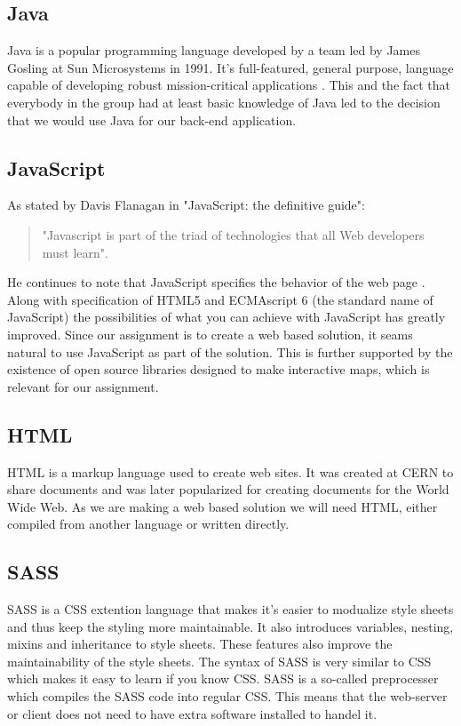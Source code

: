 \documentclass[11pt,a4paper,titlepage,oneside]{report}
\begin{document}
  \subsection{Java}
  Java is a popular programming language developed by a team led by James Gosling at Sun Microsystems in 1991. It's full-featured, general purpose, language capable of developing robust mission-critical applications \cite{liang}. This and the fact that everybody in the group had at least basic knowledge of Java led to the decision that we would use Java for our \gls{back-end} application.  
  \subsection{JavaScript}
  As stated by Davis Flanagan in "JavaScript: the definitive guide": 
  \begin{quote}
  "Javascript is part of the triad of technologies that all Web developers must learn".
  \end{quote} 
  He continues to note that JavaScript specifies the behavior of the web page \cite{fd11}. Along with specification of \gls{HTML5} and ECMAscript 6 (the standard name of JavaScript) the possibilities of what you can achieve with JavaScript has greatly improved. Since our assignment is to create a web based solution, it seams natural to use JavaScript as part of the solution. This is further supported by the existence of \gls{open source} libraries designed to make interactive maps, which is relevant for our assignment.

\subsection{HTML}
  \gls{HTML} is a markup language used to create web sites. It was created at CERN to share documents and was later popularized for creating documents for the World Wide Web. As we are making a web based solution we will need \gls{HTML}, either compiled from another language or written directly.
  \subsection{SASS}
  \gls{SASS} is a \gls{CSS} extention language that makes it's easier to modualize style sheets and thus keep the styling more maintainable. It also introduces variables, nesting, mixins and inheritance to style sheets. These features also improve the maintainability of the style sheets. The syntax of \gls{SASS} is very similar to \gls{CSS} which makes it easy to learn if you know \gls{CSS}. \gls{SASS} is a so-called preprocesser which compiles the \gls{SASS} code into regular \gls{CSS}. This means that the web-server or client does not need to have extra software installed to handel it.
  
\end{document}
